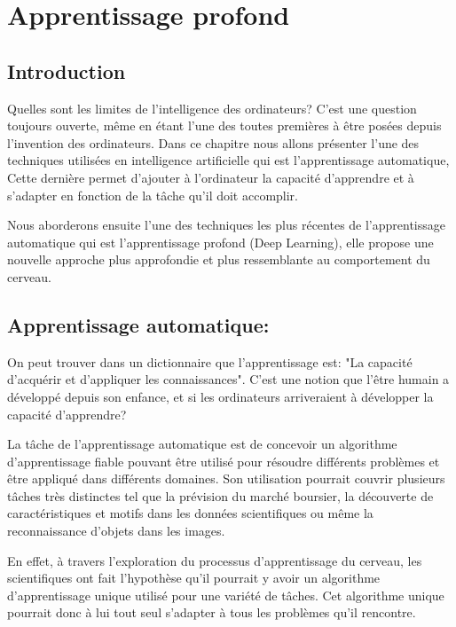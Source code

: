 
\chapter{Apprentissage profond}

\section{Introduction}

	Quelles sont les limites de l'intelligence des ordinateurs? C'est une question toujours ouverte, même en étant l'une des toutes premières à être posées depuis l'invention des ordinateurs. Dans ce chapitre nous allons présenter l'une des techniques utilisées en intelligence artificielle qui est l'apprentissage automatique, Cette dernière permet d'ajouter à l'ordinateur la capacité d'apprendre et à s'adapter en fonction de la tâche qu'il doit accomplir.
	
	Nous aborderons ensuite l'une des techniques les plus récentes de l'apprentissage automatique qui est l'apprentissage profond (Deep Learning), elle propose une nouvelle approche plus approfondie et plus ressemblante au comportement du cerveau.


\section{Apprentissage automatique:}

	On peut trouver dans un dictionnaire que l'apprentissage est: "La capacité d'acquérir et d'appliquer les connaissances". C'est une notion que l'être humain a développé depuis son enfance, et si les ordinateurs arriveraient à développer la capacité d'apprendre?

	La tâche de l'apprentissage automatique est de concevoir un algorithme d'apprentissage fiable pouvant être utilisé pour résoudre différents problèmes et être appliqué dans différents domaines. Son utilisation pourrait couvrir plusieurs tâches très distinctes tel que la prévision du marché boursier, la découverte de caractéristiques et motifs dans les données scientifiques ou même la reconnaissance d'objets dans les images.

	En effet, à travers l'exploration du processus d'apprentissage du cerveau, les scientifiques ont fait l'hypothèse qu'il pourrait y avoir un algorithme d'apprentissage unique utilisé pour une variété de tâches. Cet algorithme unique pourrait donc à lui tout seul s'adapter à tous les problèmes qu'il rencontre. 

